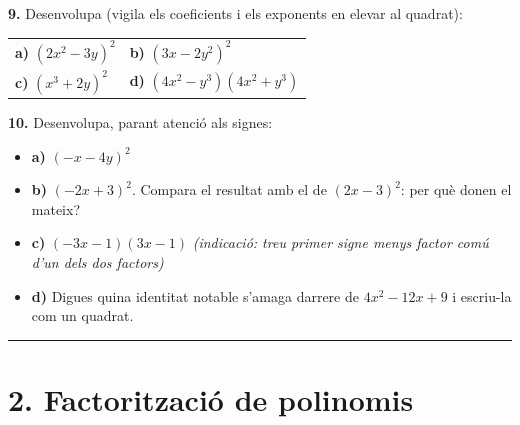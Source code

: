 \documentclass[13pt,a4paper]{extarticle}
\begin{document}
\par\noindent\begin{minipage}{\linewidth}
\textbf{9.} Desenvolupa (vigila els coeficients i els exponents en elevar al quadrat):\par

\begin{tabular}{@{}p{.46\linewidth}p{.46\linewidth}@{}}
\textbf{a)} $(2x^2-3y)^2$ & \textbf{b)} $(3x-2y^2)^2$ \\[2pt]
\textbf{c)} $(x^3+2y)^2$ & \textbf{d)} $(4x^2-y^3)(4x^2+y^3)$ \\[2pt]
\end{tabular}\par
\end{minipage}\par\vspace{1.6mm}
\par\noindent\begin{minipage}{\linewidth}
\textbf{10.} Desenvolupa, parant atenció als signes:\par

\begin{itemize}[leftmargin=0pt,itemsep=3pt,topsep=3pt,parsep=0pt,label={}]
\item \textbf{a)} $(-x-4y)^2$
\item \textbf{b)} $(-2x+3)^2$. Compara el resultat amb el de $(2x-3)^2$: per què donen el mateix?
\item \textbf{c)} $(-3x-1)(3x-1)$ \emph{(indicació: treu primer signe menys factor comú d'un dels dos factors)}
\item \textbf{d)} Digues quina identitat notable s'amaga darrere de $4x^2-12x+9$ i escriu-la com un quadrat.
\end{itemize}
\end{minipage}\par\vspace{1.6mm}
\vspace{1mm}\hrule\vspace{3mm}

\section*{2. Factorització de polinomis}
\end{document}
